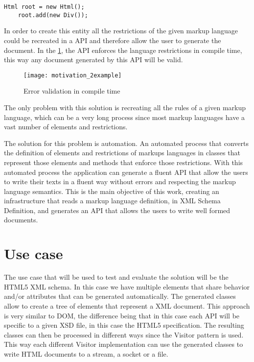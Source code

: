 \begin{lstlisting}[caption={Error validation in runtime},captionpos=b]
	Html root = new Html();
	root.add(new Div());
\end{lstlisting}

In order to create this entity all the restrictions of the given markup language could be recreated in a API and therefore allow the user to generate the document. In the \ref{motivation_2example}, the API enforces the language restrictions in compile time, this way any document generated by this API will be valid.

\begin{figure}[ht]
	\centering
	\texttt{[image: motivation\_2example]}
	\caption{Error validation in compile time}
	\label{motivation_2example}
\end{figure}

The only problem with this solution is recreating all the rules of a given markup language, which can be a very long process since most markup languages have a vast number of elements and restrictions. 

\noindent
The solution for this problem is automation. An automated process that converts the definition of elements and restrictions of markups languages in classes that represent those elements and methods that enforce those restrictions. With this automated process the application can generate a fluent API that allow the users to write their texts in a fluent way without errors and respecting the markup language semantics. This is the main objective of this work, creating an infrastructure that reads a markup language definition, in XML Schema Definition, and generates an API that allows the users to write well formed documents.

\section{Use case}

The use case that will be used to test and evaluate the solution will be the HTML5 XML schema. In this case we have multiple elements that share behavior and/or attributes that can be generated automatically. The generated classes allow to create a tree of elements that represent a XML document. This approach is very similar to DOM, the difference being that in this case each API will be specific to a given XSD file, in this case the HTML5 specification. The resulting classes can then be processed in different ways since the Visitor pattern is used. This way each different Visitor implementation can use the generated classes to write HTML documents to a stream, a socket or a file. 

